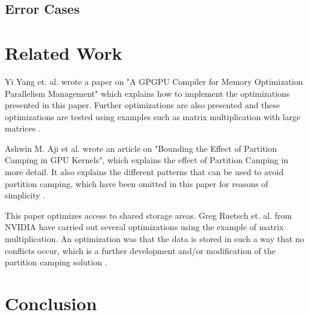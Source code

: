 \documentclass[conference]{IEEEtran}
\begin{document}
	
	\subsection{Error Cases}
	
	
\section{Related Work}

	Yi Yang et. al. wrote a paper on "A GPGPU Compiler for Memory Optimization Parallelism Management" which explains how to implement the optimizations presented in this paper. Further optimizations are also presented and these optimizations are tested using examples such as matrix multiplication with large matrices \cite{GPGPUCompiler}.
	
	Ashwin M. Aji et al. wrote an article on "Bounding the Effect of Partition Camping in GPU Kernels", which explains the effect of Partition Camping in more detail. It also explains the different patterns that can be used to avoid partition camping, which have been omitted in this paper for reasons of simplicity \cite{pc}.  
	
	This paper optimizes access to shared storage areas.  Greg Ruetsch et. al. from NVIDIA have carried out several optimizations using the example of matrix multiplication. An optimization was that the data is stored in such a way that no conflicts occur, which is a further development and/or modification of the partition camping solution \cite{mtransnvidia}.
	
\section{Conclusion}
	
\end{document}
